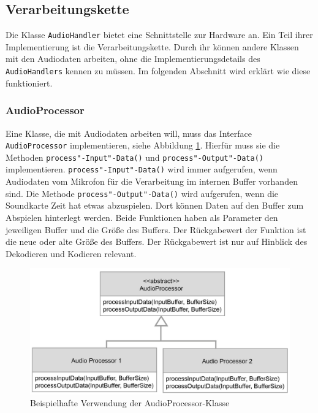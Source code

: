 \FloatBarrier
\subsection{Verarbeitungskette}
\label{processingChain}

Die Klasse \texttt{AudioHandler} bietet eine Schnittstelle zur Hardware an. Ein Teil ihrer Implementierung ist die Verarbeitungskette. Durch ihr können andere Klassen mit den Audiodaten arbeiten, ohne die Implementierungsdetails des \texttt{AudioHandlers} kennen zu müssen. Im folgenden Abschnitt wird erklärt wie diese funktioniert.

\FloatBarrier
\subsubsection{AudioProcessor}
Eine Klasse, die mit Audiodaten arbeiten will, muss das Interface \texttt{AudioProcessor} implementieren, siehe Abbildung \ref{Fig:AudioProcessorExample}. Hierfür muss sie die Methoden \texttt{process"-Input"-Data()} und \texttt{process"-Output"-Data()} implementieren. \texttt{process"-Input"-Data()} wird immer aufgerufen, wenn Audiodaten vom Mikrofon für die Verarbeitung im internen Buffer vorhanden sind. Die Methode \texttt{process"-Output"-Data()} wird aufgerufen, wenn die Soundkarte Zeit hat etwas abzuspielen. Dort können Daten auf den Buffer zum Abspielen hinterlegt werden. Beide Funktionen haben als Parameter den jeweiligen Buffer und die Größe des Buffers. Der Rückgabewert der Funktion ist die neue oder alte Größe des Buffers. Der Rückgabewert ist nur auf Hinblick des Dekodieren und Kodieren relevant.
\newline
\begin{figure}[htp]
\centering
\includegraphics[width=1\textwidth]{../img/AudioProcessorExample}
\caption{Beispielhafte Verwendung der AudioProcessor-Klasse}
\label{Fig:AudioProcessorExample}
\end{figure}


